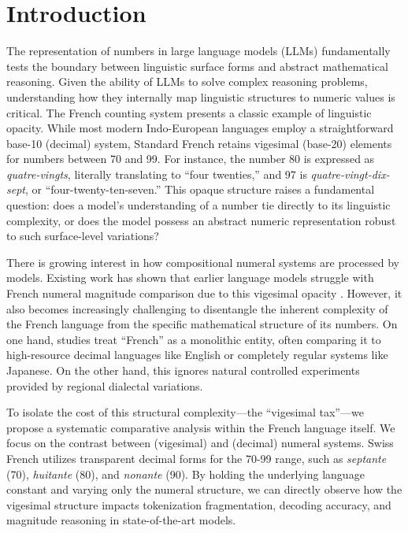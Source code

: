 \section{Introduction}

The representation of numbers in large language models (LLMs) fundamentally tests the boundary between linguistic surface forms and abstract mathematical reasoning. Given the ability of LLMs to solve complex reasoning problems, understanding how they internally map linguistic structures to numeric values is critical. The French counting system presents a classic example of linguistic opacity. While most modern Indo-European languages employ a straightforward base-10 (decimal) system, Standard French retains vigesimal (base-20) elements for numbers between 70 and 99. For instance, the number 80 is expressed as \textit{quatre-vingts}, literally translating to ``four twenties,'' and 97 is \textit{quatre-vingt-dix-sept}, or ``four-twenty-ten-seven.'' This opaque structure raises a fundamental question: does a model's understanding of a number tie directly to its linguistic complexity, or does the model possess an abstract numeric representation robust to such surface-level variations?

There is growing interest in how compositional numeral systems are processed by models. Existing work has shown that earlier language models struggle with French numeral magnitude comparison due to this vigesimal opacity \citep{johnson2020probing}. However, it also becomes increasingly challenging to disentangle the inherent complexity of the French language from the specific mathematical structure of its numbers. On one hand, studies treat ``French'' as a monolithic entity, often comparing it to high-resource decimal languages like English or completely regular systems like Japanese. On the other hand, this ignores natural controlled experiments provided by regional dialectal variations. 

To isolate the cost of this structural complexity---the ``vigesimal tax''---we propose a systematic comparative analysis within the French language itself. We focus on the contrast between \standardfrench (vigesimal) and \swissfrench (decimal) numeral systems. Swiss French utilizes transparent decimal forms for the 70-99 range, such as \textit{septante} (70), \textit{huitante} (80), and \textit{nonante} (90). By holding the underlying language constant and varying only the numeral structure, we can directly observe how the vigesimal structure impacts tokenization fragmentation, decoding accuracy, and magnitude reasoning in state-of-the-art models. 

